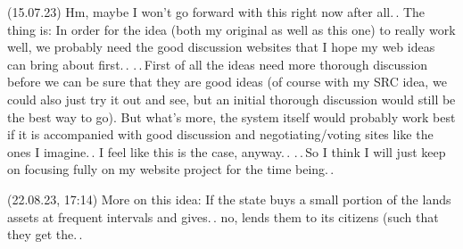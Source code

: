 \documentclass{report}
\begin{document}
(15.07.23) Hm, maybe I won't go forward with this right now after all.\,. The thing is: In order for the idea (both my original as well as this one) to really work well, we probably need the good discussion websites that I hope my web ideas can bring about first.\,. .\,.\,First of all the ideas need more thorough discussion before we can be sure that they are good ideas (of course with my SRC idea, we could also just try it out and see, but an initial thorough discussion would still be the best way to go). But what's more, the system itself would probably work best if it is accompanied with good discussion and negotiating/voting sites like the ones I imagine.\,. I feel like this is the case, anyway.\,. .\,.\,So I think I will just keep on focusing fully on my website project for the time being.\,.


(22.08.23, 17:14) More on this idea: If the state buys a small portion of the lands assets at frequent intervals and gives.\,. no, lends them to its citizens (such that they get the.\,. %
\end{document}
